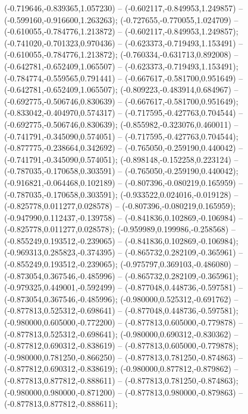  (-0.719646,-0.839365,1.057230) -- (-0.602117,-0.849953,1.249857) -- (-0.599160,-0.916600,1.263263);
 (-0.727655,-0.770055,1.024709) -- (-0.610055,-0.784776,1.213872) -- (-0.602117,-0.849953,1.249857);
 (-0.741020,-0.701323,0.970436) -- (-0.623373,-0.719493,1.153491) -- (-0.610055,-0.784776,1.213872);
 (-0.760334,-0.631713,0.892008) -- (-0.642781,-0.652409,1.065507) -- (-0.623373,-0.719493,1.153491);
 (-0.784774,-0.559565,0.791441) -- (-0.667617,-0.581700,0.951649) -- (-0.642781,-0.652409,1.065507);
 (-0.809223,-0.483914,0.684967) -- (-0.692775,-0.506746,0.830639) -- (-0.667617,-0.581700,0.951649);
 (-0.833042,-0.404970,0.574317) -- (-0.717595,-0.427763,0.704544) -- (-0.692775,-0.506746,0.830639);
 (-0.855982,-0.323076,0.460011) -- (-0.741791,-0.345090,0.574051) -- (-0.717595,-0.427763,0.704544);
 (-0.877775,-0.238664,0.342692) -- (-0.765050,-0.259190,0.440042) -- (-0.741791,-0.345090,0.574051);
 (-0.898148,-0.152258,0.223124) -- (-0.787035,-0.170658,0.303591) -- (-0.765050,-0.259190,0.440042);
 (-0.916821,-0.064468,0.102189) -- (-0.807396,-0.080219,0.165959) -- (-0.787035,-0.170658,0.303591);
 (-0.933522,0.024016,-0.019128) -- (-0.825778,0.011277,0.028578) -- (-0.807396,-0.080219,0.165959);
 (-0.947990,0.112437,-0.139758) -- (-0.841836,0.102869,-0.106984) -- (-0.825778,0.011277,0.028578);
 (-0.959989,0.199986,-0.258568) -- (-0.855249,0.193512,-0.239065) -- (-0.841836,0.102869,-0.106984);
 (-0.969313,0.285823,-0.374395) -- (-0.865732,0.282109,-0.365961) -- (-0.855249,0.193512,-0.239065);
 (-0.975797,0.369103,-0.486080) -- (-0.873054,0.367546,-0.485996) -- (-0.865732,0.282109,-0.365961);
 (-0.979325,0.449001,-0.592499) -- (-0.877048,0.448736,-0.597581) -- (-0.873054,0.367546,-0.485996);
 (-0.980000,0.525312,-0.691762) -- (-0.877813,0.525312,-0.698641) -- (-0.877048,0.448736,-0.597581);
 (-0.980000,0.605000,-0.772200) -- (-0.877813,0.605000,-0.779878) -- (-0.877813,0.525312,-0.698641);
 (-0.980000,0.690312,-0.830362) -- (-0.877812,0.690312,-0.838619) -- (-0.877813,0.605000,-0.779878);
 (-0.980000,0.781250,-0.866250) -- (-0.877813,0.781250,-0.874863) -- (-0.877812,0.690312,-0.838619);
 (-0.980000,0.877812,-0.879862) -- (-0.877813,0.877812,-0.888611) -- (-0.877813,0.781250,-0.874863);
 (-0.980000,0.980000,-0.871200) -- (-0.877813,0.980000,-0.879863) -- (-0.877813,0.877812,-0.888611);
